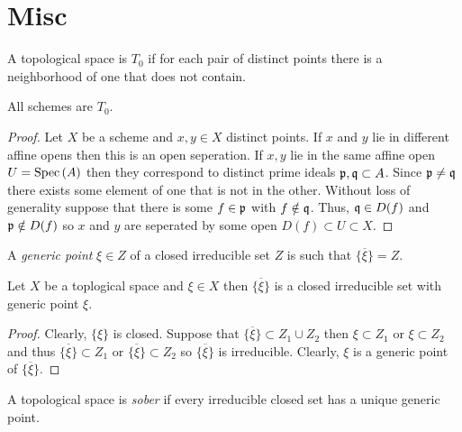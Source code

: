 \documentclass[12pt]{article}
\begin{document}
\section{Misc}

\begin{definition}
A topological space is $T_0$ if for each pair of distinct points there is a neighborhood of one that does not contain. 
\end{definition}

\begin{proposition}
All schemes are $T_0$. 
\end{proposition}

\begin{proof}
Let $X$ be a scheme and $x, y \in X$ distinct points. If $x$ and $y$ lie in different affine opens then this is an open seperation. If $x, y$ lie in the same affine open $U = \mathrm{Spec}\left( A \right)$ then they correspond to distinct prime ideals $\mathfrak{p}, \mathfrak{q} \subset A$. Since $\mathfrak{p} \neq \mathfrak{q}$ there exists some element of one that is not in the other. Without loss of generality suppose that there is some $f \in \mathfrak{p}$ with $f \notin \mathfrak{q}$. Thus, $\mathfrak{q} \in D(f)$ and $\mathfrak{p} \notin D(f)$ so $x$ and $y$ are seperated by some open $D(f) \subset U \subset X$.  
\end{proof}

\begin{definition}
A \textit{generic point} $\xi \in Z$ of a closed irreducible set $Z$ is such that $\overline{\{ \xi \} } = Z$. 
\end{definition}

\begin{proposition}
Let $X$ be a toplogical space and $\xi \in X$ then $\overline{\{ \xi \} }$ is a closed irreducible set with generic point $\xi$. 
\end{proposition}

\begin{proof}
Clearly, $\{ \xi \}$ is closed. Suppose that $\overline{\{ \xi \}} \subset Z_1 \cup Z_2$ then $\xi \subset Z_1$ or $\xi \subset Z_2$ and thus $\overline{\{ \xi \} } \subset Z_1$ or $\overline{\{ \xi \} } \subset Z_2$ so $\overline{\{ \xi \}}$ is irreducible. Clearly, $\xi$ is a generic point of $\overline{\{ \xi \}}$. 
\end{proof}

\begin{definition}
A topological space is \textit{sober} if every irreducible closed set has a unique generic point. 
\end{definition}
\end{document}
